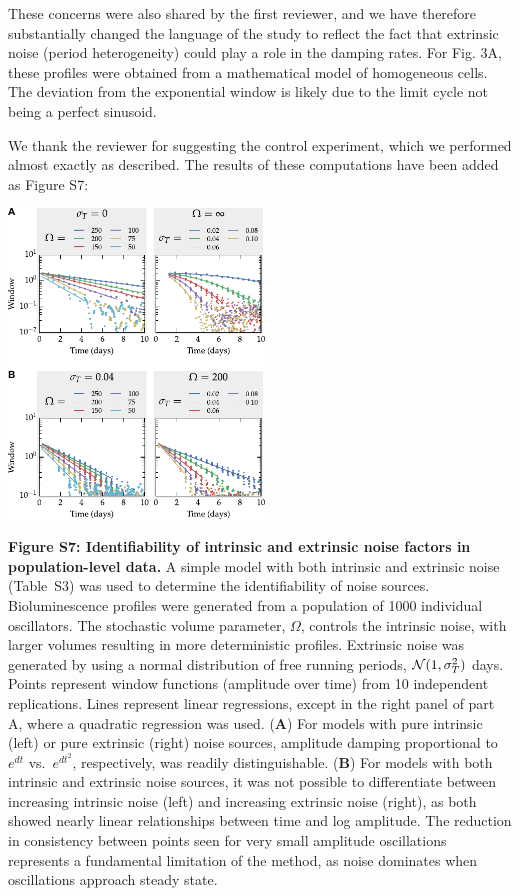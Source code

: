\documentclass[11pt, letterpaper]{article}
\newenvironment{manuscript}[1]{\begin{center}\begin{tcolorbox}[colback=green!5!white,colframe=green!75!black,width=\textwidth,title={#1},breakable,fonttitle=\bfseries]}{\end{tcolorbox}\end{center}}
\begin{document}
These concerns were also shared by the first reviewer, and we have therefore substantially changed the language of the study to reflect the fact that extrinsic noise (period heterogeneity) could play a role in the damping rates.
For Fig. 3A, these profiles were obtained from a mathematical model of homogeneous cells.
The deviation from the exponential window is likely due to the limit cycle not being a perfect sinusoid.

We thank the reviewer for suggesting the control experiment, which we performed almost exactly as described. The results of these computations have been added as Figure S7:

\begin{manuscript}{Page 16}
  \begin{center}
  \includegraphics[width=0.51\textwidth]{figures/pdfs/FigS7.pdf}
  \end{center}
  {\bfseries Figure S7: Identifiability of intrinsic and extrinsic noise factors in population-level data.} A simple model with both intrinsic and extrinsic noise (Table~S3) was used to determine the identifiability of noise sources. Bioluminescence profiles were generated from a population of 1000 individual oscillators. The stochastic volume parameter, $\Omega$, controls the intrinsic noise, with larger volumes resulting in more deterministic profiles. Extrinsic noise was generated by using a normal distribution of free running periods, ${\cal N}(1, \sigma^2_T)$ days. Points represent window functions (amplitude over time) from 10 independent replications. Lines represent linear regressions, except in the right panel of part A, where a quadratic regression was used.
  ({\bfseries A}) For models with pure intrinsic (left) or pure extrinsic (right) noise sources, amplitude damping proportional to $e^{dt}$ vs.\ $e^{dt^2}$, respectively, was readily distinguishable. 
  ({\bfseries B}) For models with both intrinsic and extrinsic noise sources, it was not possible to differentiate between increasing intrinsic noise (left) and increasing extrinsic noise (right), as both showed nearly linear relationships between time and log amplitude.
  The reduction in consistency between points seen for very small amplitude oscillations represents a fundamental limitation of the method, as noise dominates when oscillations approach steady state.
  
\end{manuscript}
\end{document}
